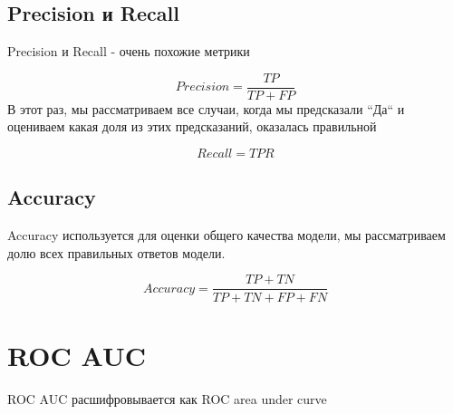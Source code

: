 \documentclass{article}
\begin{document}
        \subsection{Precision и Recall}
            Precision и Recall - очень похожие метрики

            \begin{equation}
                Precision = \dfrac{TP}{TP + FP}
            \end{equation}
            В этот раз, мы рассматриваем все случаи, когда мы предсказали ``Да`` и оцениваем какая доля из этих предсказаний, оказалась правильной

            \begin{equation}
                Recall = TPR
            \end{equation}
    
        \subsection{Accuracy}
            Accuracy используется для оценки общего качества модели,
            мы рассматриваем долю всех правильных ответов модели.


            \begin{equation}
                Accuracy = \dfrac{TP + TN}{TP + TN + FP + FN}
            \end{equation}

    \section{ROC AUC}
        ROC AUC расшифровывается как ROC area under curve
\end{document}
